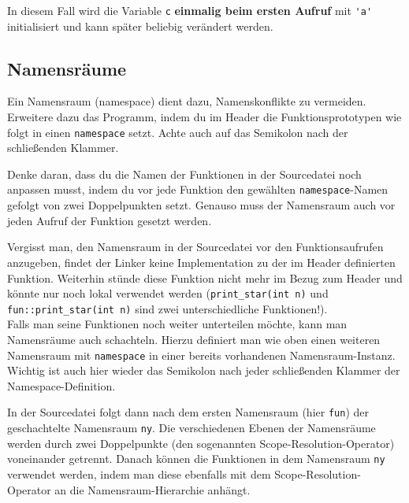 
In diesem Fall wird die Variable \lstinline{c} \textbf{einmalig beim ersten Aufruf} mit \lstinline{'a'} initialisiert und kann später beliebig verändert werden.


\subsection{Namensräume}
Ein Namensraum (namespace) dient dazu, Namenskonflikte zu vermeiden.
Erweitere dazu das Programm, indem du im Header die Funktionsprototypen wie
folgt in einen \lstinline{namespace} setzt. Achte auch auf das Semikolon nach der schließenden Klammer.


Denke daran, dass du die Namen der Funktionen in der Sourcedatei noch anpassen musst, indem du vor jede Funktion den gewählten \lstinline{namespace}-Namen gefolgt von zwei Doppelpunkten setzt.
Genauso muss der Namensraum auch vor jeden Aufruf der Funktion gesetzt werden.


Vergisst man, den Namensraum in der Sourcedatei vor den Funktionsaufrufen anzugeben, findet der Linker keine Implementation zu der im Header definierten Funktion.
Weiterhin stünde diese Funktion nicht mehr im Bezug zum Header und könnte nur noch lokal verwendet werden (\lstinline{print_star(int n)} und \lstinline{fun::print_star(int n)} sind zwei unterschiedliche Funktionen!). \\

Falls man seine Funktionen noch weiter unterteilen möchte, kann man Namensräume auch schachteln.
Hierzu definiert man wie oben einen weiteren Namensraum mit \lstinline{namespace} in einer bereits vorhandenen Namensraum-Instanz. Wichtig ist auch hier wieder das Semikolon nach jeder schließenden Klammer der Namespace-Definition.


In der Sourcedatei folgt dann nach dem ersten Namensraum (hier \lstinline{fun}) der geschachtelte Namensraum \lstinline{ny}. Die verschiedenen Ebenen der Namensräume werden durch zwei Doppelpunkte (den sogenannten Scope-Resolution-Operator) voneinander getrennt.
Danach können die Funktionen in dem Namensraum \lstinline{ny} verwendet werden, indem man diese ebenfalls mit dem Scope-Resolution-Operator an die Namensraum-Hierarchie anhängt.

